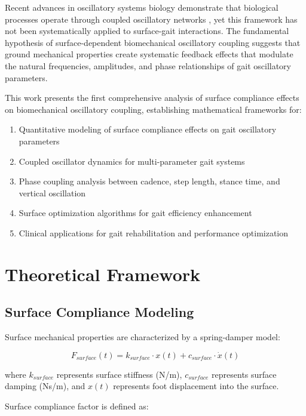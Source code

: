 \documentclass[12pt]{article}
\begin{document}
Recent advances in oscillatory systems biology demonstrate that biological processes operate through coupled oscillatory networks \citep{glass2001clocks, strogatz2003sync}, yet this framework has not been systematically applied to surface-gait interactions. The fundamental hypothesis of surface-dependent biomechanical oscillatory coupling suggests that ground mechanical properties create systematic feedback effects that modulate the natural frequencies, amplitudes, and phase relationships of gait oscillatory parameters.

This work presents the first comprehensive analysis of surface compliance effects on biomechanical oscillatory coupling, establishing mathematical frameworks for:

\begin{enumerate}
\item Quantitative modeling of surface compliance effects on gait oscillatory parameters
\item Coupled oscillator dynamics for multi-parameter gait systems
\item Phase coupling analysis between cadence, step length, stance time, and vertical oscillation
\item Surface optimization algorithms for gait efficiency enhancement
\item Clinical applications for gait rehabilitation and performance optimization
\end{enumerate}

\section{Theoretical Framework}

\subsection{Surface Compliance Modeling}

Surface mechanical properties are characterized by a spring-damper model:

\begin{equation}
F_{surface}(t) = k_{surface} \cdot x(t) + c_{surface} \cdot \dot{x}(t)
\end{equation}

where $k_{surface}$ represents surface stiffness (N/m), $c_{surface}$ represents surface damping (Ns/m), and $x(t)$ represents foot displacement into the surface.

Surface compliance factor is defined as:
\end{document}
